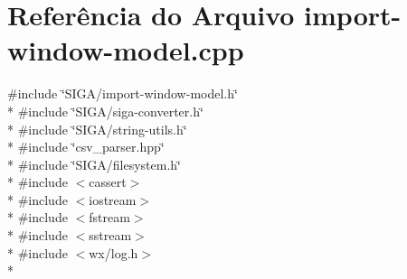 \section{Referência do Arquivo import-\/window-\/model.cpp}
\label{import-window-model_8cpp}
{\ttfamily \#include \char`\"{}S\+I\+G\+A/import-\/window-\/model.\+h\char`\"{}}\\*
{\ttfamily \#include \char`\"{}S\+I\+G\+A/siga-\/converter.\+h\char`\"{}}\\*
{\ttfamily \#include \char`\"{}S\+I\+G\+A/string-\/utils.\+h\char`\"{}}\\*
{\ttfamily \#include \char`\"{}csv\+\_\+parser.\+hpp\char`\"{}}\\*
{\ttfamily \#include \char`\"{}S\+I\+G\+A/filesystem.\+h\char`\"{}}\\*
{\ttfamily \#include $<$cassert$>$}\\*
{\ttfamily \#include $<$iostream$>$}\\*
{\ttfamily \#include $<$fstream$>$}\\*
{\ttfamily \#include $<$sstream$>$}\\*
{\ttfamily \#include $<$wx/log.\+h$>$}\\*
